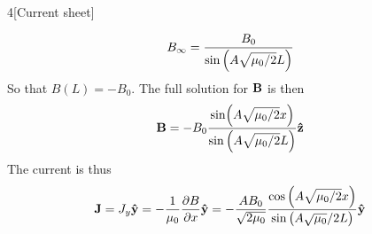 \documentclass[12pt]{article}
\begin{document}
\begin{problem}{4}[Current sheet]
\begin{solution}
    \begin{equation}
        B_\infty=\frac{B_0}{\sin\qty(A\sqrt{\mu_0/2}L)} 
    \end{equation}
    So that $B(L)=-B_0$. The full solution for $\vb{B}$ is then
    \begin{equation}
        \vb{B}=-B_0\frac{\sin(A\sqrt{\mu_0/2}x)}{\sin\qty(A\sqrt{\mu_0/2}L)}\vb{\hat{z}}
    \end{equation}
    The current is thus
    \begin{equation}
        \vb{J}=J_y\vb{\hat{y}}=-\frac1{\mu_0}\frac{\partial B}{\partial x}\vb{\hat{y}} 
        =-\frac{AB_0}{\sqrt{2\mu_0}}\frac{\cos\qty(A\sqrt{\mu_0/2}x)}{\sin\qty(A\sqrt{\mu_0}/2L)}\vb{\hat{y}}
    \end{equation}
\end{solution}
\end{problem}
\end{document}
